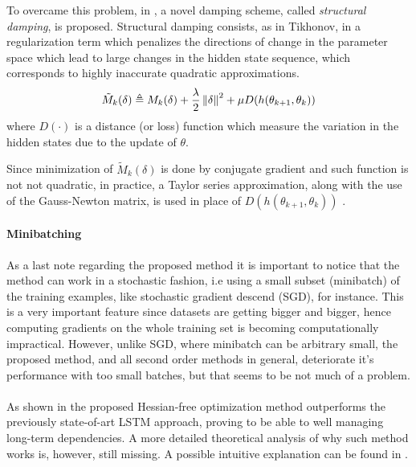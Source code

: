 To overcame this problem, in \cite{hessianFree}, a novel damping scheme, called \textit{structural damping}, is proposed.
Structural damping consists, as in Tikhonov, in a regularization term which  penalizes the directions of change in the parameter space which lead to large changes in the hidden state sequence, which corresponds to highly inaccurate quadratic approximations.
\begin{equation}
 \tilde{M}_k(\delta) \triangleq  M_k(\delta) + \frac{\lambda}{2} \left\Vert \delta \right\Vert^2 + \mu D(h(\theta_{k+1}, \theta_{k}))
\end{equation}
where $D(\cdot)$ is a distance (or loss) function which measure the variation in the hidden states due to the update of $\theta$.

Since minimization of $\tilde{M}_k(\delta)$ is done by conjugate gradient and such function is not not quadratic, in practice, a Taylor series approximation, along with the use of the Gauss-Newton matrix, is used in place of $D(h(\theta_{k+1}, \theta_{k}))$ .

\paragraph{Minibatching}
As a last note regarding the proposed method it is important to notice that the method can work in a stochastic fashion, 
i.e using a small subset (minibatch) of the training examples, like stochastic gradient descend (SGD), for instance. This 
is a very important feature since datasets are getting bigger and bigger, hence computing gradients on the whole training 
set is becoming computationally impractical. However, unlike SGD, where minibatch can be arbitrary small, the proposed 
method, and all second order methods in general, deteriorate it's performance with too small batches, but that seems to be not much of a problem.
\\\\
As shown in \cite{hessianFree} the proposed Hessian-free optimization method outperforms the previously 
state-of-art LSTM\cite{lstm} approach, proving to be able to well managing long-term dependencies. A more detailed 
theoretical analysis of why such method works is, however, still missing. A possible intuitive explanation can be found 
in \cite{advancesInOptimizingRnns,pascanu}. 
